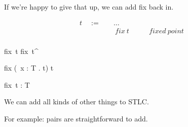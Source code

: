 \begin{frame}
  If we're happy to give that up, we can add fix back in.
\end{frame}

\begin{frame}
  \begin{mdframed}[frametitle={Terms}]
\begin{displaymath}
    \begin{aligned}
t \quad:=\quad& \ldots &\\
  & ~ fix~t \quad\quad &fixed~point\\
    \end{aligned}
\end{displaymath}
  \end{mdframed}
\end{frame}

\begin{frame}
  \begin{mdframed}[frametitle={Small-step semantics}]

  {fix~t \longrightarrow fix~t^{\prime}}

  \infrule[E-FixBeta]
  {}
  {fix
    \left(\lambda~x {:} T . t\right)
    \longrightarrow {}t}

  \end{mdframed}
\end{frame}

\begin{frame}
  \begin{mdframed}[frametitle={Typing rules}]

  {\vdash fix~t {:} T}

  \end{mdframed}
\end{frame}

\begin{frame}
 We can add all kinds of other things to STLC. 
\end{frame}

\begin{frame}
For example: pairs are straightforward to add.
\end{frame}


